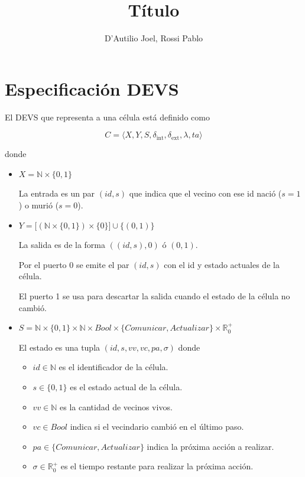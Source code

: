 \documentclass[12pt]{article}
\title{Título}
\author{D'Autilio Joel, Rossi Pablo}
\date{}
\newcommand{\dint}{\delta_{\text{int}}}
\newcommand{\dext}{\delta_{\text{ext}}}
\newcommand{\R}{\mathbb{R}}
\newcommand{\N}{\mathbb{N}}
\begin{document}
\maketitle

\section{Especificación DEVS}

El DEVS que representa a una célula está definido como

\[ C = \langle X, Y, S, \dint, \dext, \lambda, ta \rangle \]

donde

\begin{itemize}
  \item $X = \N \times \{0,1\}$

    La entrada es un par $(id, s)$ que indica que el vecino con ese id nació ($s=1$) o murió ($s=0$).

  \item $Y = \big[ (\N \times \{0,1\}) \times \{0\} \big] \cup \{(0, 1)\}$

    La salida es de la forma $((id, s), 0)$ ó $(0, 1)$.

    Por el puerto 0 se emite el par $(id, s)$ con el id y estado actuales de la célula.

    El puerto 1 se usa para descartar la salida cuando el estado de la célula no cambió.

  \item $S = \N \times \{0, 1\} \times \N \times Bool \times \{Comunicar, Actualizar\} \times \R_0^+$

    El estado es una tupla $(id, s, vv, vc, pa, \sigma)$ donde

    \begin{itemize}
      \item $id \in \N$ es el identificador de la célula.
      \item $s \in \{0, 1\}$ es el estado actual de la célula.
      \item $vv \in \N$ es la cantidad de vecinos vivos.
      \item $vc \in Bool$ indica si el vecindario cambió en el último paso.
      \item $pa \in \{Comunicar, Actualizar\}$ indica la próxima acción a realizar.
      \item $\sigma \in \R_0^+$ es el tiempo restante para realizar la próxima acción.
    \end{itemize}


\end{itemize}
\end{document}

